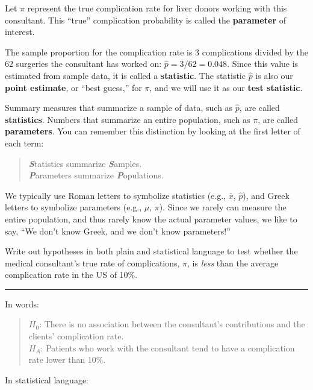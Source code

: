 \documentclass[
  10pt,
  openany]{book}
\theoremstyle{definition}
\theoremstyle{definition}
\theoremstyle{definition}
\theoremstyle{definition}
\theoremstyle{remark}
\begin{document}
Let \(\pi\) represent the true complication rate for liver donors working with this consultant. This ``true'' complication probability is called the \textbf{parameter} of interest.

The sample proportion for the complication rate is 3 complications divided by the 62 surgeries the consultant has worked on: \(\hat{p} = 3/62 = 0.048\). Since this value is estimated from sample data, it is called a \textbf{statistic}. The statistic \(\hat{p}\) is also our \textbf{point estimate}, or ``best guess,'' for \(\pi\), and we will use it as our \textbf{test statistic}.

Summary measures that summarize a sample of data, such as \(\hat{p}\), are called \textbf{statistics}. Numbers that summarize an entire population, such as \(\pi\), are called \textbf{parameters}. You can remember this distinction by looking at the first letter of each term:

\begin{quote}
\textbf{\emph{S}}tatistics summarize \textbf{\emph{S}}amples.\\
\textbf{\emph{P}}arameters summarize \textbf{\emph{P}}opulations.
\end{quote}

We typically use Roman letters to symbolize statistics (e.g., \(\bar{x}\), \(\hat{p}\)), and Greek letters to symbolize parameters (e.g., \(\mu\), \(\pi\)). Since we rarely can measure the entire population, and thus rarely know the actual parameter values, we like to say, ``We don't know Greek, and we don't know parameters!''

Write out hypotheses in both plain and statistical language to test whether the medical consultant's true rate of complications, \(\pi\), is \emph{less} than the average complication rate in the US of 10\%.

\begin{center}\rule{0.5\linewidth}{0.5pt}\end{center}

In words:

\begin{quote}
\(H_0\): There is no association between the consultant's contributions and the clients' complication rate.\\
\(H_A\): Patients who work with the consultant tend to have a complication rate lower than 10\%.
\end{quote}

In statistical language:
\end{document}
